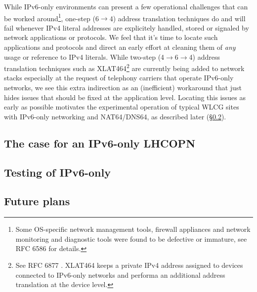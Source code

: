 While IPv6-only environments can present a few operational challenges that
can be worked around\footnote{Some OS-specific network management tools,
firewall appliances and network monitoring and diagnostic tools were found
to be defective or immature, see RFC 6586 \cite{rfc} for details.},
one-step (6$\rightarrow$4) address translation techniques do and will fail whenever 
IPv4 literal addresses are explicitely handled, stored or signaled by
network applications or protocols. We feel that it's time to
locate such applications and protocols and direct an early effort
at cleaning them of {\it any} usage or reference to IPv4 literals. While 
two-step (4$\rightarrow$6$\rightarrow$4) address translation techniques
such as XLAT464\footnote{See RFC 6877 \cite{rfc}. XLAT464 keeps a private
IPv4 address assigned to devices connected to IPv6-only networks and
performa an additional address translation at the device level.}
are currently being added to 
network stacks especially at the request of telephony carriers that operate
IPv6-only networks, we see this extra indirection as an (inefficient)
workaround that just hides issues that should be fixed at the application
level. Locating this issues as early as possible motivates the experimental
operation of typical
WLCG sites with IPv6-only networking and NAT64/DNS64, as described
later (\S \ref{ssec:ipv6onlytest}).

\subsection{The case for an IPv6-only LHCOPN}


\subsection{Testing of IPv6-only}
\label{ssec:ipv6onlytest}


\subsection{Future plans}
